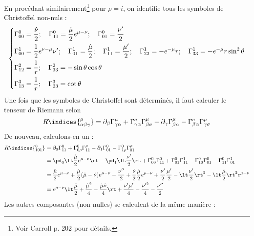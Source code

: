 En procédant similairement\footnote{Voir Carroll p. 202 pour détails.} pour $\rho = i$, on identifie tous les symboles de Christoffel non-nuls :
\begin{align}
    \begin{dcases}
        \Gamma^0_{00} = \frac{\dot{\nu}}{2}; \quad \Gamma^0_{11} = \frac{\dot{\mu}}{2} e^{\mu-\nu}; \quad \Gamma^0_{01} = \frac{\nu'}{2}\\
        \Gamma^1_{00} = \frac{1}{2} e^{\nu - \mu} \nu' ; \quad \Gamma^1_{01} = \frac{\dot{\mu}}{2}; \quad \Gamma^1_{11} = \frac{\mu'}{2}; \quad \Gamma^1_{22} = - e^{-\mu} r; \quad \Gamma^1_{33}  = -e^{-\mu} r \sin^2 \theta\\
        \Gamma^2_{12} = \frac{1}{r}; \quad \Gamma^2_{33} = -\sin \theta \cos\theta\\
        \Gamma^3_{13} =\frac{1}{r} ; \quad \Gamma^3_{23} = \cot \theta
    \end{dcases}
\end{align}
Une fois que les symboles de Christoffel sont déterminés, il faut calculer le tenseur de Riemann selon 
\begin{equation}
    R\indices{^{\mu}_{\alpha \beta \gamma}} =  \partial_{\beta}\Gamma^{\mu}_{\gamma \alpha} + \Gamma^{\sigma}_{\gamma \alpha} \Gamma^{\mu}_{\beta \sigma} - \partial_{\gamma}\Gamma^{\mu}_{\beta \alpha} - \Gamma^{\sigma}_{\beta \alpha} \Gamma^{\mu}_{\gamma \sigma}
\end{equation}
De nouveau, calculons-en un :
\begin{align}
    R\indices{^0_{101}} &= \partial_{0}\Gamma^{0}_{11} + \Gamma^{0}_{0 \rho} \Gamma^{\rho}_{11} - \partial_{1}\Gamma^{0}_{01} - \Gamma^{0}_{1\rho} \Gamma^{\rho}_{01}\\
    & = \pd_0 \lt \frac{\dot{\mu}}{2} e^{\mu-\nu}\rt - \pd_1 \lt \frac{\nu'}{2} \rt + \Gamma^{0}_{0 0}\Gamma^{0}_{11} + \Gamma^{0}_{0 1}\Gamma^{1}_{11} - \Gamma^{0}_{10} \Gamma^{0}_{0 1} - \Gamma^{0}_{11} \Gamma^{1}_{0 1}\\
    &= \frac{\ddot{\mu}}{2} e^{\mu-\nu} + \frac{\dot{\mu}}{2} (\dot{\mu} - \dot{\nu}) e^{\mu-\nu} - \frac{\nu''}{2}+ \frac{\dot{\nu}}{2} \frac{\dot{\mu}}{2}e^{\mu-\nu} + \frac{\nu'}{2}\frac{\mu'}{2} - \lt \frac{\nu'}{2}\rt^2 - \lt \frac{\dot{\mu}}{2} \rt^2 e^{\mu-\nu} \\
    & = e^{\mu-\nu} \lt \frac{\ddot{\mu}}{2} + \frac{\dot{\mu}^2}{4} - \frac{\dot{\mu} \dot{\nu}}{4} \rt + \frac{\nu' \mu'}{4} - \frac{\nu'^2}{4}- \frac{\nu''}{2}
\end{align}
Les autres composantes (non-nulles) se calculent de la même manière :
